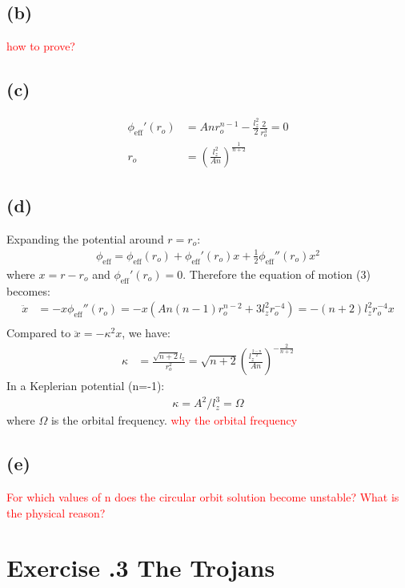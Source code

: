 \documentclass[a4paper,12pt]{article}
\begin{document}
\subsection*{(b)}
\textcolor{red}{how to prove?}

\subsection*{(c)}
\begin{align*}
    \phi_{\text{eff}}'(r_o) &= An r_o^{n-1} - \frac{l_z^2}{2} \frac{2}{r_o^3} = 0 \\
    r_o &= (\frac{l_z^2}{An})^{\frac{1}{n+2}}
\end{align*}

\subsection*{(d)}
Expanding the potential around $r = r_o$:
\begin{align*}
    \phi_{\text{eff}} = \phi_{\text{eff}}(r_o) + \phi_{\text{eff}}'(r_o) x + \frac{1}{2} \phi_{\text{eff}}''(r_o) x^2
\end{align*}
where $x = r - r_o$ and $\phi_{\text{eff}}'(r_o)=0$.
Therefore the equation of motion (3) becomes:
\begin{align*}
    \ddot{x} &= - x \phi_{\text{eff}}''(r_o) = -x(An(n-1)r_o^{n-2} + 3 l_z^2 r_o^{-4}) = -(n+2)l_z^2 r_o^{-4} x \\
\end{align*}
Compared to $\ddot{x} = -\kappa^2 x$, we have:
\begin{align*}
    \kappa &= \frac{\sqrt{n+2} l_z}{r_o^2} = \sqrt{n+2} (\frac{l_z^{\frac{2-n}{2}}}{An})^{-\frac{2}{n+2}}
\end{align*}
In a Keplerian potential (n=-1):
\begin{align*}
    \kappa = A^2 / l_z^3 = \Omega
\end{align*}
where $\Omega$ is the orbital frequency.
\textcolor{red}{why the orbital frequency}

\subsection*{(e)}
\textcolor{red}{For which values of n does the circular orbit solution become unstable? What is the physical
reason?}

\section*{\textbf{Exercise \uppercase\expandafter{}.3 The Trojans}}
\end{document}
